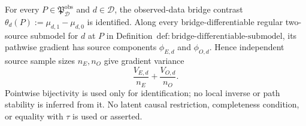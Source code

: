 For every \(P\in\mathfrak P_{\mathcal D}^{\mathrm{obs}}\) and \(d\in\mathcal D\), the observed-data bridge contrast \(\theta_d(P):=\mu_{d,1}-\mu_{d,0}\) is identified. Along every bridge-differentiable regular two-source submodel for \(d\) at \(P\) in Definition~\(\mathrm{def{:}bridge\text{-}differentiable\text{-}submodel}\), its pathwise gradient has source components \(\phi_{E,d}\) and \(\phi_{O,d}\). Hence independent source sample sizes \(n_E,n_O\) give gradient variance
\[
 \frac{V_{E,d}}{n_E}+\frac{V_{O,d}}{n_O}.
\]
Pointwise bijectivity is used only for identification; no local inverse or path stability is inferred from it. No latent causal restriction, completeness condition, or equality with \(\tau\) is used or asserted.